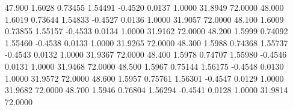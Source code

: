   47.900   1.6028   0.73455   1.54491  -0.4520   0.0137   1.0000  31.8949  72.0000
  48.000   1.6019   0.73644   1.54833  -0.4527   0.0136   1.0000  31.9057  72.0000
  48.100   1.6009   0.73855   1.55157  -0.4533   0.0134   1.0000  31.9162  72.0000
  48.200   1.5999   0.74092   1.55460  -0.4538   0.0133   1.0000  31.9265  72.0000
  48.300   1.5988   0.74368   1.55737  -0.4543   0.0132   1.0000  31.9367  72.0000
  48.400   1.5978   0.74707   1.55980  -0.4546   0.0131   1.0000  31.9468  72.0000
  48.500   1.5967   0.75144   1.56175  -0.4548   0.0130   1.0000  31.9572  72.0000
  48.600   1.5957   0.75761   1.56301  -0.4547   0.0129   1.0000  31.9682  72.0000
  48.700   1.5946   0.76804   1.56294  -0.4541   0.0128   1.0000  31.9814  72.0000
